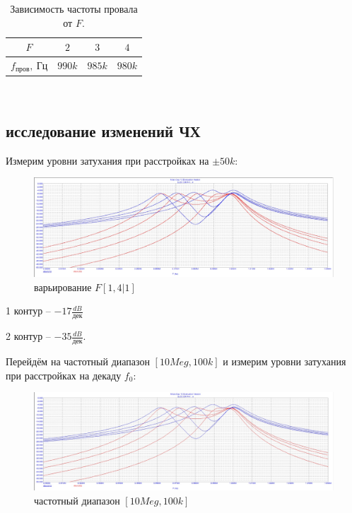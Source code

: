 \documentclass[a4paper, 14pt]{extarticle}%
\begin{document}
\begin{table}[h!]
	\label{t3}
	\begin{tabular}{c|c|c|c} 
		$F$               & $2$    & $3$    & $4$    \\ \hline
		$f_{\text{пров}},~\text{Гц}$ & $990k$ & $985k$ & $980k$ \\ \hline
	\end{tabular}
		\caption{Зависимость частоты провала от $F$. }

\end{table}

~

\subsection{исследование изменений ЧХ}

Измерим уровни затухания при расстройках на $\pm 50k$:

\begin{figure}[h!]
	\centering
			\includegraphics[width=1.1\linewidth]{2.2_varF.jpg}
            \caption{варьирование $F  [1,4|1]$}
	\label{A}
\end{figure}

1 контур -- $-17 \frac{dB}{\text{дек}}$

2 контур -- $-35 \frac{dB}{\text{дек}}$.

Перейдём на частотный диапазон $[10Meg,100k]$ и измерим уровни затухания при расстройках на декаду $f_0$:

\begin{figure}[h!]
	\centering
			\includegraphics[width=1.1\linewidth]{2.2_freq_range.jpg}
            \caption{частотный диапазон $[10Meg, 100k]$}
	\label{A}
\end{figure}
\end{document}
